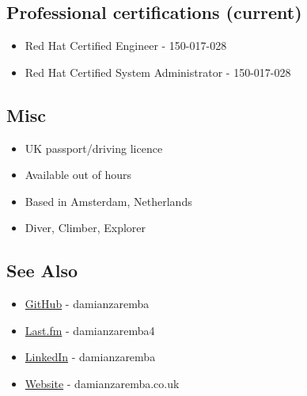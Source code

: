 \subsection{Professional certifications
(current)}\label{professional-certifications-current}

\begin{itemize}
\tightlist
\item
  Red Hat Certified Engineer - 150-017-028
\item
  Red Hat Certified System Administrator - 150-017-028
\end{itemize}

\subsection{Misc}\label{misc}

\begin{itemize}
\tightlist
\item
  UK passport/driving licence
\item
  Available out of hours
\item
  Based in Amsterdam, Netherlands
\item
  Diver, Climber, Explorer
\end{itemize}

\subsection{See Also}\label{see-also}

\begin{itemize}
\tightlist
\item
  \href{https://github.com/damianzaremba}{GitHub} - damianzaremba
\item
  \href{http://last.fm/user/damianzaremba4}{Last.fm} - damianzaremba4
\item
  \href{http://uk.linkedin.com/in/damianzaremba}{LinkedIn} -
  damianzaremba
\item
  \href{http://damianzaremba.co.uk}{Website} - damianzaremba.co.uk
\end{itemize}
